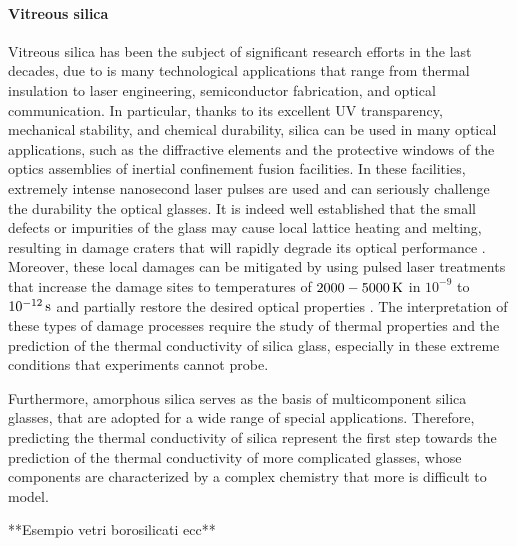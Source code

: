 \paragraph{Vitreous silica}
Vitreous silica has been the subject of significant research efforts in the last decades, due to is many technological applications that range from thermal insulation to laser engineering, semiconductor fabrication, and optical communication.
In particular, thanks to its excellent UV transparency, mechanical stability, and chemical durability, silica can be used in many optical applications, such as the diffractive elements and the protective windows of the optics assemblies of inertial confinement fusion facilities. In these facilities, extremely intense nanosecond laser pulses are used and can seriously challenge the durability the optical glasses. It is indeed well established that the small defects or impurities of the glass may cause local lattice heating and melting, resulting in damage craters that will rapidly degrade its optical performance \cite{Miller2004,Canaud2004,Miller2010,Chambonneau2014,Kuzuu1999,Stuart1995,Wong2006,Carr2010,Saito2000}. Moreover, these local damages can be mitigated by using pulsed laser treatments that increase the damage sites to temperatures of $2000-5000\,\mathrm{K}$ in $10^{-9}$ to $10^{-12}\,\mathrm{s}$ and partially restore the desired optical properties \cite{Soules2011}. 
The interpretation of these types of damage processes require the study of thermal properties and the prediction of the thermal conductivity of silica glass, especially in these extreme conditions that experiments cannot probe.

Furthermore, amorphous silica serves as the basis of multicomponent silica glasses, that are adopted for a wide range of special applications. 
Therefore, predicting the thermal conductivity of silica represent the first step towards the prediction of the thermal conductivity of more complicated glasses, whose components are characterized by a complex chemistry that more is difficult to model.

**Esempio vetri borosilicati ecc**

